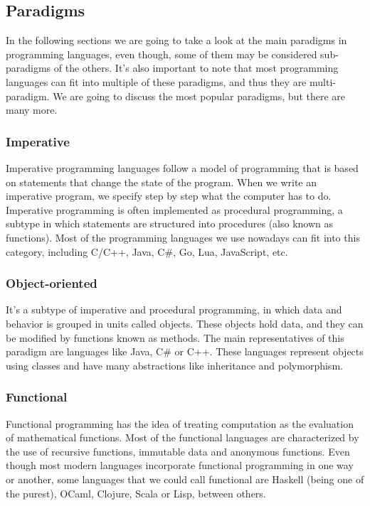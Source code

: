 ﻿\documentclass[10pt,a4paper,twocolumn,twoside]{article}
\begin{document}
\subsection{Paradigms}
In the following sections we are going to take a look at the main paradigms in
programming languages, even though, some of them may be considered sub-paradigms
of the others. It's also important to note that most programming languages can
fit into multiple of these paradigms, and thus they are multi-paradigm. We are
going to discuss the most popular paradigms, but there are many more.

\subsubsection{Imperative}
Imperative programming languages follow a model of programming that is based on
statements that change the state of the program. When we write an imperative 
program, we specify step by step what the computer has to do. Imperative 
programming is often implemented as procedural programming, a subtype in which
statements are structured into procedures (also known as functions). Most of
the programming languages we use nowadays can fit into this category, including
C/C++, Java, C\#, Go, Lua, JavaScript, etc.

\subsubsection{Object-oriented}
It's a subtype of imperative and procedural programming, in which data and
behavior is grouped in units called objects. These objects hold data, and they
can be modified by functions known as methods. The main representatives of this
paradigm are languages like Java, C\# or C++. These languages represent objects
using classes and have many abstractions like inheritance and polymorphism.

\subsubsection{Functional}
Functional programming has the idea of treating computation as the evaluation of
mathematical functions. Most of the functional languages are characterized by
the use of recursive functions, immutable data and anonymous functions. Even
though most modern languages incorporate functional programming in one way or
another, some languages that we could call functional are Haskell (being one of
the purest), OCaml, Clojure, Scala or Lisp, between others.
\end{document}
